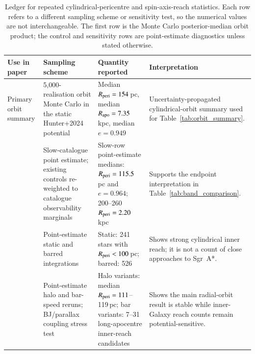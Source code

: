 ﻿\begin{table}[!htbp]
\centering
\caption{Ledger for repeated cylindrical-pericentre and spin-axis-reach statistics.
Each row refers to a different sampling scheme or sensitivity test, so
the numerical values are not interchangeable. The first row is the
Monte Carlo posterior-median orbit product; the control and sensitivity
rows are point-estimate diagnostics unless stated otherwise.\label{tab:orbit_statistic_ledger}}
\scriptsize
\setlength{\tabcolsep}{3pt}
\begin{tabular}{llll}
\hline\hline
Use in paper & Sampling scheme & Quantity reported & Interpretation \\
\hline
\parbox[t]{0.17\textwidth}{Primary orbit summary} &
\parbox[t]{0.25\textwidth}{5{,}000-realisation orbit Monte Carlo in the static Hunter+2024 potential} &
\parbox[t]{0.25\textwidth}{Median $R_{\mathrm{peri}}=154$\,pc, median $R_{\mathrm{apo}}=7.35$\,kpc, median $e=0.949$} &
\parbox[t]{0.24\textwidth}{Uncertainty-propagated cylindrical-orbit summary used for Table~\ref{tab:orbit_summary}.} \\
\addlinespace[0.6ex]
\parbox[t]{0.17\textwidth}{Control comparison} &
\parbox[t]{0.25\textwidth}{Slow-catalogue point estimate; existing controls re-weighted to catalogue observability marginals} &
\parbox[t]{0.25\textwidth}{Slow-row point-estimate medians: $\Rperi=115.5$\,pc and $e=0.964$; 200--260\kms{} $\Rperi=2.20$\,kpc} &
\parbox[t]{0.24\textwidth}{Supports the endpoint interpretation in Table~\ref{tab:band_comparison}.} \\
\addlinespace[0.6ex]
\parbox[t]{0.17\textwidth}{Cylindrical spin-axis reach} &
\parbox[t]{0.25\textwidth}{Point-estimate static and barred integrations} &
\parbox[t]{0.25\textwidth}{Static: 241 stars with $\Rperi<100$\,pc; barred: 526} &
\parbox[t]{0.24\textwidth}{Shows strong cylindrical inner reach; it is not a count of close approaches to Sgr~A*.} \\
\addlinespace[0.6ex]
\parbox[t]{0.17\textwidth}{Halo/bar/distance sensitivity} &
\parbox[t]{0.25\textwidth}{Point-estimate halo and bar-speed reruns; BJ/parallax coupling stress test} &
\parbox[t]{0.25\textwidth}{Halo variants: median $\Rperi=111$--119\,pc; bar variants: 7--31 long-apocentre inner-reach candidates} &
\parbox[t]{0.24\textwidth}{Shows the main radial-orbit result is stable while inner-Galaxy reach counts remain potential-sensitive.} \\
\hline
\end{tabular}
\end{table}
